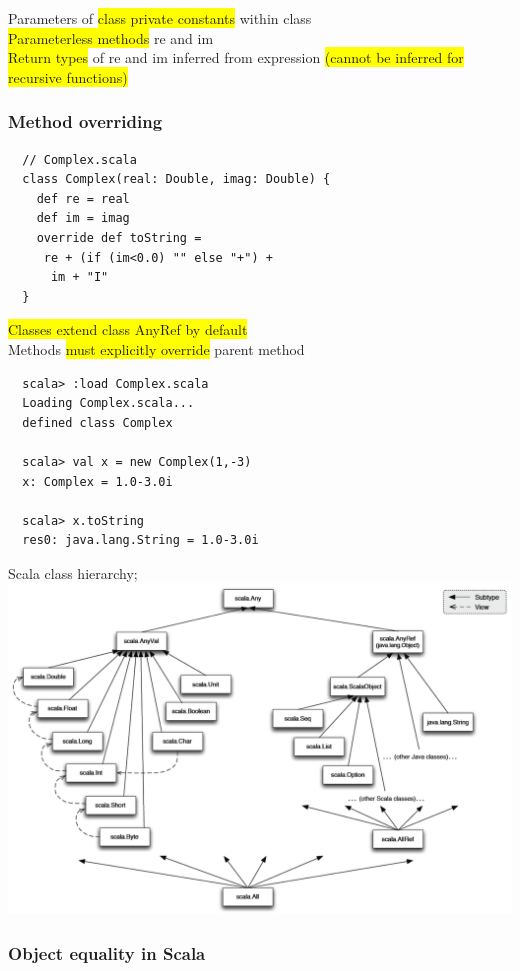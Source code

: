 \documentclass[tikz,border=10pt]{project_plan}
\begin{document}
Parameters of \colorbox{yellow}{class private constants} within class\\
\colorbox{yellow}{Parameterless methods} re and im\\
\colorbox{yellow}{Return types} of re and im inferred from expression
\colorbox{yellow}{(cannot be inferred for recursive functions)}

\subsubsection{Method overriding}

\begin{lstlisting}
  // Complex.scala
  class Complex(real: Double, imag: Double) {
    def re = real
    def im = imag
    override def toString =
     re + (if (im<0.0) "" else "+") +
      im + "I"
  }
\end{lstlisting}
\colorbox{yellow}{Classes extend class AnyRef by default}\\
Methods \colorbox{yellow}{must explicitly override} parent method

\begin{lstlisting}
  scala> :load Complex.scala
  Loading Complex.scala...
  defined class Complex

  scala> val x = new Complex(1,-3)
  x: Complex = 1.0-3.0i

  scala> x.toString
  res0: java.lang.String = 1.0-3.0i
\end{lstlisting}

Scala class hierarchy;\\
\includegraphics[width=\linewidth]{scala class hierarchy.png}

\subsubsection{Object equality in Scala}
\end{document}
